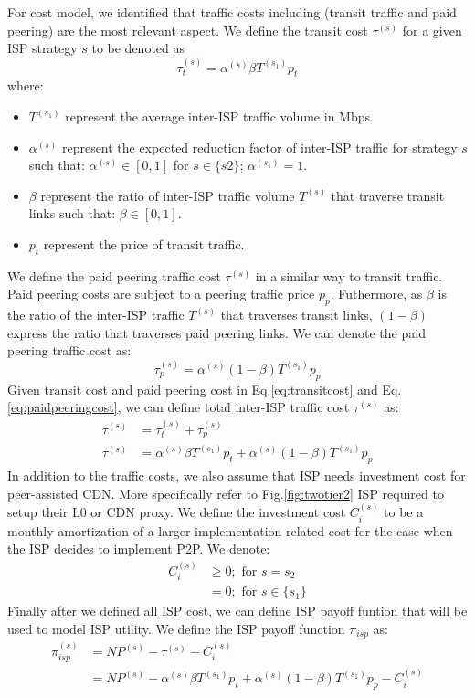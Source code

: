 \documentclass[paper]{ieice}
\begin{document}
For cost model, we identified that traffic costs including (transit traffic and paid peering) are the most relevant aspect. 
We define the transit cost $\tau^{(s)}$ for a given ISP strategy $s$ to be denoted as 
\begin{equation}\label{eq:transitcost}
	\tau^{(s)}_t = \alpha^{(s)} \beta T^{(s_1)} p_t
\end{equation}
where:
\begin{itemize}
	\item $T^{(s_1)}$ represent the average inter-ISP traffic volume in Mbps.
	\item $\alpha^{(s)}$ represent the expected reduction factor of inter-ISP traffic for strategy $s$ such that: $\alpha^{(s)} \in [0,1]$ for $s \in \{s2\}$;  $\alpha^{(s_1)} = 1$.
	\item $\beta$ represent the ratio of inter-ISP traffic volume $T^{(s)}$ that traverse transit links such that: $\beta \in [0,1]$.
	\item $p_t$ represent the price of transit traffic.
\end{itemize}
We define the paid peering traffic cost $\tau^{(s)}$ in a similar way to transit traffic. 
Paid peering costs are subject to a peering traffic price $p_p$.
Futhermore, as $\beta$ is the ratio of the inter-ISP traffic $T^{(s)}$ that traverses transit links, $(1-\beta)$ express the ratio that traverses paid peering links.
We can denote the paid peering traffic cost as:
\begin{equation}\label{eq:paidpeeringcost}
	\tau^{(s)}_p = \alpha^{(s)} (1-\beta) T^{(s_1)} p_p
\end{equation}
Given transit cost and paid peering cost in Eq.\ref{eq:transitcost} and Eq.\ref{eq:paidpeeringcost}, we can define total inter-ISP traffic cost $\tau^{(s)}$ as:
\begin{align}
	\tau^{(s)} &= \tau^{(s)}_t + \tau^{(s)}_p \\
	\tau^{(s)} &= \alpha^{(s)} \beta T^{(s_1)} p_t + \alpha^{(s)} (1-\beta) T^{(s_1)} p_p
\end{align}
In addition to the traffic costs, we also assume that ISP needs investment cost for peer-assisted CDN.
More specifically refer to Fig.\ref{fig:twotier2} ISP required to setup their L0 or CDN proxy.
We define the investment cost $C^{(s)}_i$ to be a monthly amortization of a larger implementation related cost for the case when the ISP decides to implement P2P. 
We denote:
\begin{align}
	C^{(s)}_i &\ge 0; \text{ for } s = s_2 \\
	          &= 0; \text{ for } s \in \{s_1\}
\end{align}
Finally after we defined all ISP cost, we can define ISP payoff funtion that will be used to model ISP utility.  
We define the ISP payoff function $\pi_{isp}$ as:
\begin{align}\label{eq:isppayoff}
	\pi_{isp}^{(s)} &= N P^{(s)} - \tau^{(s)} - C_i^{(s)} \\
	 &= N P^{(s)} - \alpha^{(s)} \beta T^{(s_1)} p_t + \alpha^{(s)} (1-\beta) T^{(s_1)} p_p - C_i^{(s)} 
\end{align}
\end{document}
